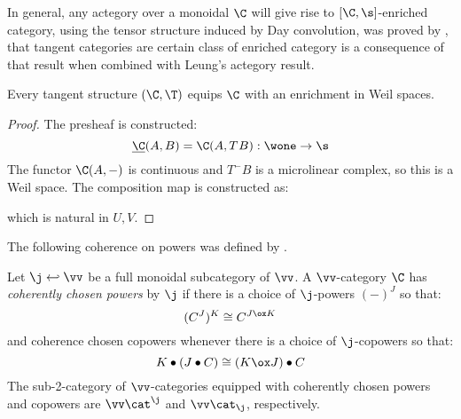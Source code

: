 In general, any actegory over a monoidal $\C$ will give rise to $[\C,\s]$-enriched category, using the tensor structure induced by Day convolution, was proved by \cite{Wood1978}, that tangent categories are certain class of enriched category is a consequence of that result when combined with Leung's actegory result.
\begin{proposition}
	Every tangent structure $(\C, \T)$ equips $\C$ with an enrichment in Weil spaces.
\end{proposition}
\begin{proof}
	The presheaf is constructed:
	\[
		\underline{\C}(A,B) = \C(A, T^{}B): \wone \to \s 
	\]
	The functor $\C(A,-)$ is continuous and $T^{-}B$ is a microlinear complex, so this is a Weil space. The composition map is constructed as:
	
	which is natural in $U,V$.
\end{proof}
The following coherence on powers was defined by \cite{LucyshynWright2016}.
\begin{definition}
	Let $\j \hookleftarrow \vv$ be a full monoidal subcategory of $\vv$. A $\vv$-category $\C$ has \emph{coherently chosen powers} by $\j$ if there is a choice of $\j$-powers $(-)^J$ so that:
	\[
		(C^J)^K \cong C^{J \ox K}
	\]
	and coherence chosen copowers whenever there is a choice of $\j$-copowers so that:
	\[
		K \bullet (J \bullet C) \cong (K \ox J) \bullet C	
	\]
	The sub-2-category of $\vv$-categories equipped with coherently chosen powers and copowers are $\vv\cat^\j$ and $\vv\cat_\j$, respectively.
\end{definition}

